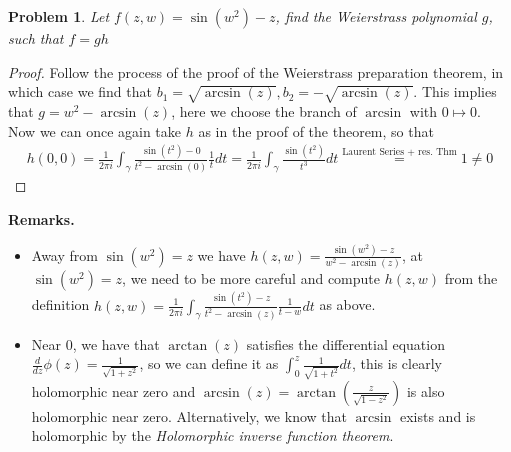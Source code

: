 \documentclass[11pt]{article}
\theoremstyle{definition}
\newtheorem{pb}{Problem}
\begin{document}
    \begin{pb}
        \emph{Let \(f(z,w) = \sin(w^2) - z\), find the Weierstrass polynomial \(g\), such that \(f = gh\)}

        \begin{proof}
            Follow the process of the proof of the Weierstrass preparation theorem, in which case we find that \(b_1 = \sqrt{\arcsin(z)}, b_2 = -\sqrt{\arcsin(z)}\). This implies that \(g = w^2 - \arcsin(z)\), here we choose the branch of \(\arcsin\) with \(0 \mapsto 0\). Now we can once again take \(h\) as in the proof of the theorem, so that
            \begin{align*}
                h(0,0) = \frac{1}{2\pi i}\int_\gamma \frac{\sin(t^2) - 0}{t^2 - \arcsin(0)}\frac{1}{t}dt = \frac{1}{2\pi i}\int_\gamma \frac{\sin(t^2)}{t^3}dt \overset{\text{Laurent Series + res. Thm}}{=} 1 \neq 0
            \end{align*}
        \end{proof}

        \textbf{Remarks.}
        \begin{itemize}
            \item Away from \(\sin(w^2) = z\) we have \(h(z,w) = \frac{\sin(w^2) - z}{w^2 - \arcsin(z)}\), at \(\sin(w^2) = z\), we need to be more careful and compute \(h(z,w)\) from the definition \(h(z,w) = \frac{1}{2\pi i}\int_\gamma\frac{\sin(t^2) - z}{t^2 - \arcsin(z)}\frac{1}{t-w}dt\) as above.
            \item Near \(0\), we have that \(\arctan(z)\) satisfies the differential equation \(\frac{d}{dz}\phi(z) = \frac{1}{\sqrt{1 + z^2}}\), so we can define it as \(\int_0^z \frac{1}{\sqrt{1 + t^2}}dt\), this is clearly holomorphic near zero and \(\arcsin(z) = \arctan(\frac{z}{\sqrt{1 - z^2}})\) is also holomorphic near zero. Alternatively, we know that \(\arcsin\) exists and is holomorphic by the \emph{Holomorphic inverse function theorem}.
        \end{itemize}
    \end{pb}
\end{document}

